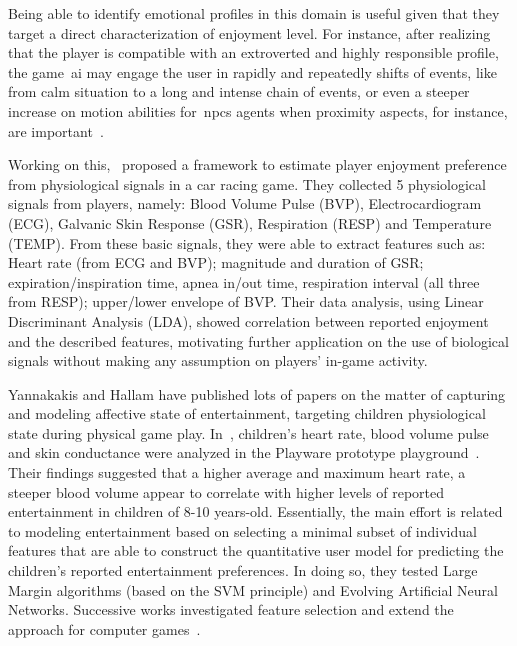 Being able to identify emotional profiles in this domain is useful given that they target a direct characterization of enjoyment level. For instance, after realizing that the player is compatible with an extroverted and highly responsible profile, the game~\gls{ai} may engage the user in rapidly and repeatedly shifts of events, like from calm situation to a long and intense chain of events, or even a steeper increase on motion abilities for~\gls{npc}s agents when proximity aspects, for instance, are important~\citep{bakkes_player_2012}.

Working on this,~\cite{tognetti_modeling_2010} proposed a framework to estimate player enjoyment preference from physiological signals in a car racing game. They collected 5 physiological signals from players, namely: Blood Volume Pulse (BVP), Electrocardiogram (ECG), Galvanic Skin Response (GSR), Respiration (RESP) and Temperature (TEMP). From these basic signals, they were able to extract features such as: Heart rate (from ECG and BVP); magnitude and duration of GSR; expiration/inspiration time, apnea in/out time, respiration interval (all three from RESP); upper/lower envelope of BVP. Their data analysis, using Linear Discriminant Analysis (LDA), showed correlation between reported enjoyment and the described features, motivating further application on the use of biological signals without making any assumption on players' in-game activity.

Yannakakis and Hallam have published lots of papers on the matter of capturing and modeling affective state of entertainment, targeting children physiological state during physical game play. In~\cite{yannakakis_modeling_2006,yannakakis_entertainment_2008}, children's heart rate, blood volume pulse and skin conductance were analyzed in the Playware prototype playground~\cite{lund_playware_2005}. Their findings suggested that a higher average and maximum heart rate, a steeper blood volume appear to correlate with higher levels of reported entertainment in children of 8-10 years-old. Essentially, the main effort is related to modeling entertainment based on selecting a minimal subset of individual features that are able to construct the quantitative user model for predicting the children's reported entertainment preferences. In doing so, they tested Large Margin algorithms (based on the SVM principle) and Evolving Artificial Neural Networks. Successive works investigated feature selection and extend the approach for computer games~\citep{yannakakis_towards_2006,yannakakis_entertainment_2007,yannakakis_feature_2007,yannakakis_entertainment_2008-1}. 

